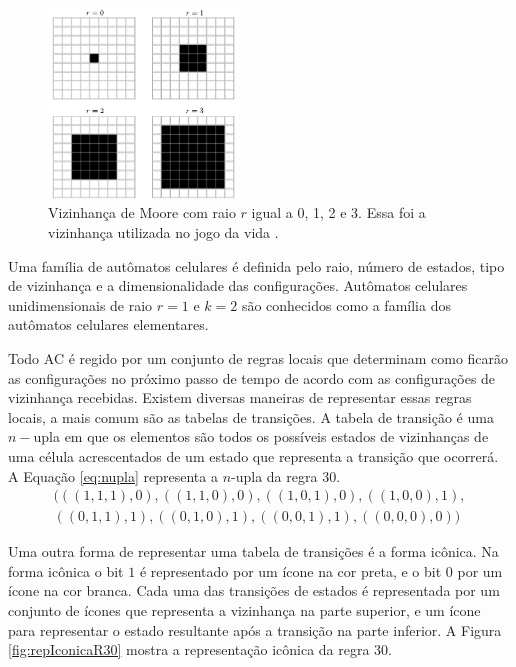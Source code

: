 \documentclass[12pt,a4paper]{article}
\begin{document}
	\begin{figure}[h!]
	  \centering
  	  \includegraphics[width=0.45\textwidth]{fig_vMoore.pdf}
	  \caption{Vizinhança de Moore com raio $r$ igual a 0, 1, 2 e 3. Essa foi a vizinhança utilizada no jogo da vida \cite{weisstein2015c}.}
	  \label{fig:vMoore}
	\end{figure}

Uma família de autômatos celulares é definida pelo raio, número de estados, tipo de vizinhança e a dimensionalidade das configurações. Autômatos celulares unidimensionais de raio $r=1$ e $k=2$ são conhecidos como a família dos autômatos celulares elementares.

Todo AC é regido por um conjunto de regras locais que determinam como ficarão as configurações no próximo passo de tempo de acordo com as configurações de vizinhança recebidas. Existem diversas maneiras de representar essas regras locais, a mais comum são as tabelas de transições. A tabela de transição é uma $n-$upla em que os elementos são todos os possíveis estados de vizinhanças de uma célula acrescentados de um estado que representa a transição que ocorrerá. A Equação \ref{eq:nupla} representa a $n$-upla da regra 30.
\begin{equation}
\begin{split}
(((1,1,1),0),((1,1,0),0),((1,0,1),0),((1,0,0),1),\\
((0,1,1),1),((0,1,0),1),((0,0,1),1),((0,0,0),0))
\label{eq:nupla}
\end{split}
\end{equation}

Uma outra forma de representar uma tabela de transições é a forma icônica. Na forma icônica o bit $1$ é representado por um ícone na cor preta, e o bit $0$ por um ícone na cor branca. Cada uma das transições de estados é representada por um conjunto de ícones que representa a vizinhança na parte superior, e um ícone para representar o estado resultante após a transição na parte inferior. A Figura \ref{fig:repIconicaR30} mostra a representação icônica da regra 30.
\end{document}
